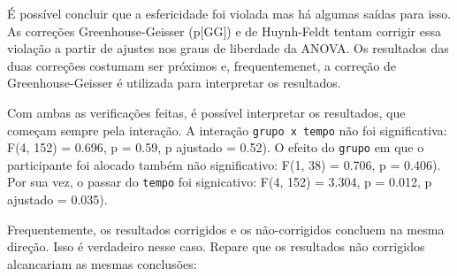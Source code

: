 \documentclass[
]{book}
\newenvironment{Shaded}{\begin{snugshade}}{\end{snugshade}}
\newcommand{\KeywordTok}[1]{\textcolor[rgb]{0.13,0.29,0.53}{\textbf{#1}}}
\newcommand{\NormalTok}[1]{#1}
\newcommand{\OperatorTok}[1]{\textcolor[rgb]{0.81,0.36,0.00}{\textbf{#1}}}
\newcommand{\StringTok}[1]{\textcolor[rgb]{0.31,0.60,0.02}{#1}}
\begin{document}
É possível concluir que a esfericidade foi violada mas há algumas saídas para isso. As correções Greenhouse-Geisser (p{[}GG{]}) e de Huynh-Feldt tentam corrigir essa violação a partir de ajustes nos graus de liberdade da ANOVA. Os resultados das duas correções costumam ser próximos e, frequentemenet, a correção de Greenhouse-Geisser é utilizada para interpretar os resultados.

Com ambas as verificações feitas, é possível interpretar os resultados, que começam sempre pela interação. A interação \texttt{grupo\ x\ tempo} não foi significativa: F(4, 152) = 0.696, p = 0.59, p ajustado = 0.52). O efeito do \texttt{grupo} em que o participante foi alocado também não significativo: F(1, 38) = 0.706, p = 0.406). Por sua vez, o passar do \texttt{tempo} foi signicativo: F(4, 152) = 3.304, p = 0.012, p ajustado = 0.035).

Frequentemente, os resultados corrigidos e os não-corrigidos concluem na mesma direção. Isso é verdadeiro nesse caso. Repare que os resultados não corrigidos alcancariam as mesmas conclusões:

\begin{Shaded}
\end{Shaded}
\end{document}

